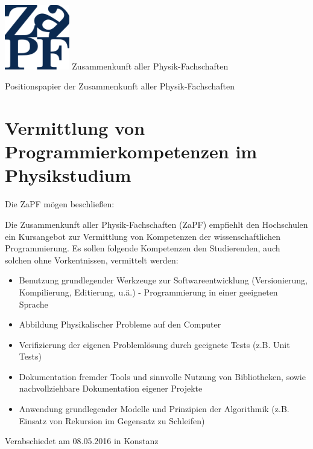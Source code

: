 \documentclass[DIV=calc]{scrartcl}
\begin{document}
\hspace{0.87\textwidth}
\begin{minipage}{120pt}
\vspace{-1.8cm}
\includegraphics[width=80pt]{logo.pdf}
\centering
\small Zusammenkunft aller Physik-Fachschaften
\end{minipage}
\begin{center}
\huge{Positionspapier der Zusammenkunft aller Physik-Fachschaften} \\
\normalsize
\end{center}

\vspace{1cm}
\section*{Vermittlung von Programmierkompetenzen im Physikstudium}

Die ZaPF mögen beschließen:

Die Zusammenkunft aller Physik-Fachschaften (ZaPF) empfiehlt den Hochschulen ein  Kursangebot zur Vermittlung von Kompetenzen der wissenschaftlichen Programmierung. Es sollen folgende Kompetenzen den Studierenden, auch solchen ohne Vorkentnissen, vermittelt werden:
\begin{itemize}
\item Benutzung grundlegender Werkzeuge zur Softwareentwicklung (Versionierung, Kompilierung, Editierung, u.ä.) - Programmierung in einer geeigneten Sprache
\item Abbildung Physikalischer Probleme auf den Computer
\item Verifizierung der eigenen Problemlösung durch geeignete Tests (z.B. Unit Tests)
\item Dokumentation fremder Tools und sinnvolle Nutzung von Bibliotheken, sowie nachvollziehbare Dokumentation eigener Projekte
\item Anwendung grundlegender Modelle und Prinzipien der Algorithmik (z.B. Einsatz von Rekursion im Gegensatz zu Schleifen)
\end{itemize}


\vfill
\begin{flushright}
Verabschiedet am 08.05.2016 in Konstanz
\end{flushright}
\end{document}
